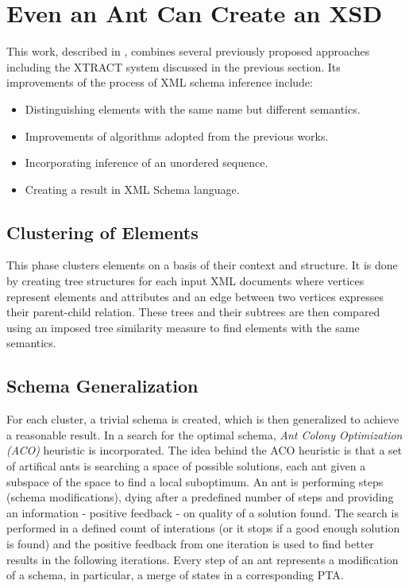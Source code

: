 
\section{Even an Ant Can Create an XSD} \label{section_even_an_ant_can_create_an_xsd}
This work, described in \cite{Vosta:2008:EAC:1802514.1802522}, combines several previously proposed approaches including the XTRACT system discussed in the previous section. Its improvements of the process of XML schema inference include:

\begin{itemize}
\item Distinguishing elements with the same name but different semantics.
\item Improvements of algorithms adopted from the previous works.
\item Incorporating inference of an unordered sequence.
\item Creating a result in XML Schema language.
\end{itemize}

\subsection{Clustering of Elements}
This phase clusters elements on a basis of their context and structure. It is done by creating tree structures for each input XML documents where vertices represent elements and attributes and an edge between two vertices expresses their parent-child relation. These trees and their subtrees are then compared using an imposed tree similarity measure to find elements with the same semantics.

\subsection{Schema Generalization}
For each cluster, a trivial schema is created, which is then generalized to achieve a reasonable result. In a search for the optimal schema, \emph{Ant Colony Optimization (ACO)} heuristic is incorporated. The idea behind the ACO heuristic is that a set of artifical ants is searching a space of possible solutions, each ant given a subspace of the space to find a local suboptimum. An ant 
is performing steps (schema modifications), dying after a predefined number of steps and providing an information - positive feedback - on quality of a solution found. The search is performed in a defined count of interations (or it stops if a good enough solution is found) and the positive feedback from one iteration is used to find better results in the following iterations. Every step of an ant represents a modification of a schema, in particular, a merge of states in a corresponding PTA.

